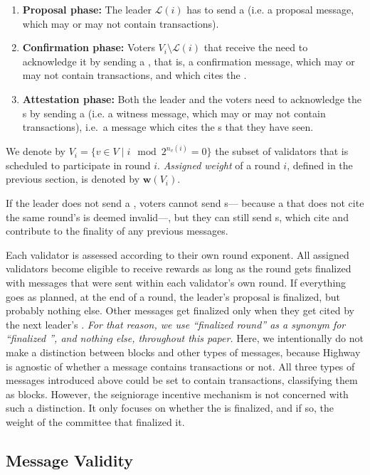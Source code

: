 \begin{enumerate}
\item \textbf{Proposal phase:}
  The leader $\mathcal{L}(i)$ has to send a \PROP{} (i.e. a proposal message, which may or may not contain transactions).
\item \textbf{Confirmation phase:}
  Voters $V_i\setminus \mathcal{L}(i)$ that receive the \PROP need to acknowledge it by sending a \CONF, that is, a confirmation message, which may or may not contain transactions, and which cites the \PROP.
\item \textbf{Attestation phase:}
  Both the leader and the voters need to acknowledge the \CONF{}s by sending a \WIT{} (i.e. a witness message, which may or may not contain transactions), i.e.~a message which cites the \CONF{}s that they have seen.
\end{enumerate}

We denote by $V_{i}=\{v\in V \mid i \mod 2^{n_v(i)} = 0\}$ the subset of validators that is scheduled to participate in round $i$. \emph{Assigned weight} of a round $i$, defined in the previous section, is denoted by $\boldsymbol{w}(V_i)$.

If the leader does not send a \PROP, voters cannot send \CONF{}s--- because a \CONF that does not cite the same round's \PROP is deemed invalid---, but they can still send \WIT{}s, which cite and contribute to the finality of any previous messages.

Each validator is assessed according to their own round exponent. All assigned validators become eligible to receive rewards as long as the round gets finalized with messages that were sent within each validator's own round. If everything goes as planned, at the end of a round, the leader's proposal is finalized, but probably nothing else. Other messages get finalized only when they get cited by the next leader's \PROP. \emph{For that reason, we use ``finalized round'' as a synonym for ``finalized \PROP'', and nothing else, throughout this paper.} Here, we intentionally do not make a distinction between blocks and other types of messages, because Highway is agnostic of whether a message contains transactions or not. All three types of messages introduced above could be set to contain transactions, classifying them as blocks. However, the seigniorage incentive mechanism is not concerned with such a distinction. It only focuses on whether the \PROP is finalized, and if so, the weight of the committee that finalized it.

\subsection{Message Validity}
\label{sec:message-validity}

